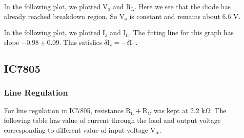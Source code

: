 \documentclass[12pt]{article}
\begin{document}
In the following plot, we plotted \( \mathrm{V_o}\) and \( \mathrm{R_L}\). Here we see that the diode has already reached breakdown region. So \( \mathrm{V_{o}}\) is constant and remains about 6.6 V.
\begin{figure}[H]
    \centering
    
\end{figure}
In the following plot, we plotted \( \mathrm{I_z}\) and \( \mathrm{I_L}\). The fitting line for this graph has slope \( -0.98 \pm 0.09 \). This satisfies \( \delta \mathrm{I_z} = - \delta \mathrm{I_L}\).
\begin{figure}[H]
    \centering
    
\end{figure}


\subsection{IC7805}
\subsubsection{Line Regulation}
For line regulation in IC7805, resistance \( \mathrm{R_L + R_C }\) was kept at 2.2 \( \mathrm{k} \Omega\). The following table has value of current through the load and output voltage corresponding to different value of  input voltage \( \mathrm{V_{in }}\).
\end{document}
